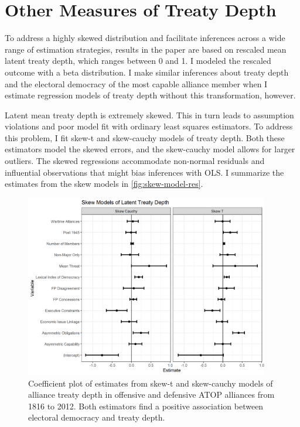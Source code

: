 \documentclass[12pt]{article}
\begin{document}
\section{Other Measures of Treaty Depth}


To address a highly skewed distribution and facilitate inferences across a wide range of estimation strategies, results in the paper are based on rescaled mean latent treaty depth, which ranges between 0 and 1. 
I modeled the rescaled outcome with a beta distribution. 
I make similar inferences about treaty depth and the electoral democracy of the most capable alliance member when I estimate regression models of treaty depth without this transformation, however. 


Latent mean treaty depth is extremely skewed. 
This in turn leads to assumption violations and poor model fit with ordinary least squares estimators. 
To address this problem, I fit skew-t and skew-cauchy models of treaty depth.
Both these estimators model the skewed errors, and the skew-cauchy model allows for larger outliers.   
The skewed regressions accommodate non-normal residuals and influential observations that might bias inferences with OLS. 
I summarize the estimates from the skew models in \autoref{fig:skew-model-res}. 


\begin{figure}[htbp]
	\centering
		\includegraphics[width=0.95\textwidth]{skew-model-res.png}
	\caption{Coefficient plot of estimates from skew-t and skew-cauchy models of alliance treaty depth in offensive and defensive ATOP alliances from 1816 to 2012. Both estimators find a positive association between electoral democracy and treaty depth.}
	\label{fig:skew-model-res}
\end{figure} 
\end{document}
